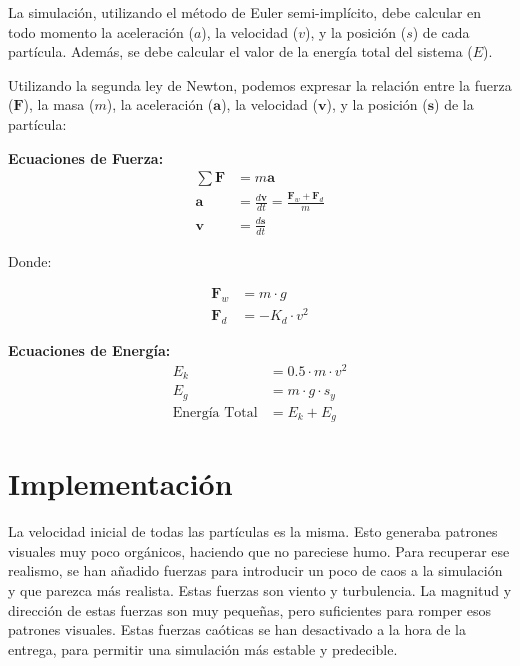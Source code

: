 \documentclass{article}
\begin{document}
La simulación, utilizando el método de Euler semi-implícito, debe calcular en todo momento la aceleración (\(a\)), la velocidad (\(v\)), y la posición (\(s\)) de cada partícula. Además, se debe calcular el valor de la energía total del sistema (\(E\)).

Utilizando la segunda ley de Newton, podemos expresar la relación entre la fuerza (\(\mathbf{F}\)), la masa (\(m\)), la aceleración (\(\mathbf{a}\)), la velocidad (\(\mathbf{v}\)), y la posición (\(\mathbf{s}\)) de la partícula:

\noindent
\textbf{Ecuaciones de Fuerza:}
\begin{align*}
    \sum\mathbf{F} & = m\mathbf{a}                                                    \\
    \mathbf{a}     & = \frac{d\mathbf{v}}{dt} = \frac{\mathbf{F}_w + \mathbf{F}_d}{m} \\
    \mathbf{v}     & = \frac{d\mathbf{s}}{dt}
\end{align*}

\noindent
Donde:


\begin{align*}
    \mathbf{F}_w & = m \cdot g      \\
    \mathbf{F}_d & = -K_d \cdot v^2
\end{align*}

\noindent
\textbf{Ecuaciones de Energía:}
\begin{align*}
    E_k                  & = 0.5 \cdot m \cdot v^2 \\
    E_g                  & = m \cdot g \cdot s_y   \\
    \text{Energía Total} & = E_k + E_g
\end{align*}

\section{Implementación}

La velocidad inicial de todas las partículas es la misma. Esto generaba patrones visuales muy poco orgánicos, haciendo que no pareciese humo. Para recuperar ese realismo, se han añadido fuerzas para introducir un poco de caos a la simulación y que parezca más realista. Estas fuerzas son viento y turbulencia. La magnitud y dirección de estas fuerzas son muy pequeñas, pero suficientes para romper esos patrones visuales. Estas fuerzas caóticas se han desactivado a la hora de la entrega, para permitir una simulación más estable y predecible.
\end{document}
